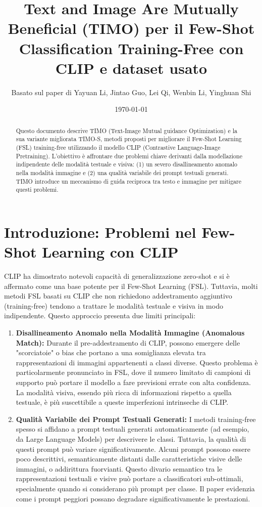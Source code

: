 \documentclass[11pt,a4paper]{article}
\title{Text and Image Are Mutually Beneficial (TIMO) per il Few-Shot Classification Training-Free con CLIP e dataset usato}
\author{Basato sul paper di Yayuan Li, Jintao Guo, Lei Qi, Wenbin Li, Yinghuan Shi}
\date{\today}
\begin{document}
\maketitle
\begin{abstract}
Questo documento descrive TIMO (Text-Image Mutual guidance Optimization) e la sua variante migliorata TIMO-S, metodi proposti per migliorare il Few-Shot Learning (FSL) training-free utilizzando il modello CLIP (Contrastive Language-Image Pretraining). L'obiettivo è affrontare due problemi chiave derivanti dalla modellazione indipendente delle modalità testuale e visiva: (1) un severo disallineamento anomalo nella modalità immagine e (2) una qualità variabile dei prompt testuali generati. TIMO introduce un meccanismo di guida reciproca tra testo e immagine per mitigare questi problemi.
\end{abstract}

\newpage
\tableofcontents
\newpage

\section{Introduzione: Problemi nel Few-Shot Learning con CLIP}
CLIP ha dimostrato notevoli capacità di generalizzazione zero-shot e si è affermato come una base potente per il Few-Shot Learning (FSL). Tuttavia, molti metodi FSL basati su CLIP che non richiedono addestramento aggiuntivo (training-free) tendono a trattare le modalità testuale e visiva in modo indipendente. Questo approccio presenta due limiti principali:

\begin{enumerate}
    \item \textbf{Disallineamento Anomalo nella Modalità Immagine (Anomalous Match):}
    Durante il pre-addestramento di CLIP, possono emergere delle "scorciatoie" o bias che portano a una somiglianza elevata tra rappresentazioni di immagini appartenenti a classi diverse. Questo problema è particolarmente pronunciato in FSL, dove il numero limitato di campioni di supporto può portare il modello a fare previsioni errate con alta confidenza. La modalità visiva, essendo più ricca di informazioni rispetto a quella testuale, è più suscettibile a queste imperfezioni intrinseche di CLIP.

    \item \textbf{Qualità Variabile dei Prompt Testuali Generati:}
    I metodi training-free spesso si affidano a prompt testuali generati automaticamente (ad esempio, da Large Language Models) per descrivere le classi. Tuttavia, la qualità di questi prompt può variare significativamente. Alcuni prompt possono essere poco descrittivi, semanticamente distanti dalle caratteristiche visive delle immagini, o addirittura fuorvianti. Questo divario semantico tra le rappresentazioni testuali e visive può portare a classificatori sub-ottimali, specialmente quando si considerano più prompt per classe. Il paper evidenzia come i prompt peggiori possano degradare significativamente le prestazioni.
\end{enumerate}
\end{document}
